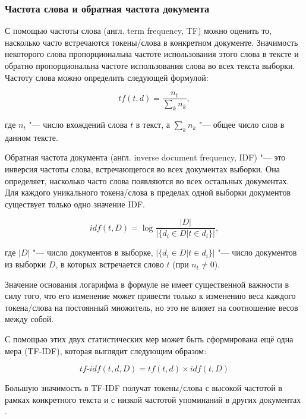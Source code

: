 \documentclass[bachelor, och, coursework]{SCWorks}
\begin{document}
        \subsubsection{Частота слова и обратная частота документа}

            С помощью частоты слова (англ. term frequency, TF) можно оценить то,
            насколько часто встречаются токены/слова в конкретном документе.
            Значимость некоторого слова пропорциональна частоте использования
            этого слова в тексте и обратно пропорциональна частоте использования
            слова во всех текста выборки. Частоту слова можно определить
            следующей формулой:

            $$tf(t, d) = \frac{n_t}{\sum_k n_k},$$

            где $n_t$ "--- число вхождений слова $t$ в текст, а $\sum_k n_k$
            "--- общее число слов в данном тексте.

            Обратная частота документа (англ. inverse document frequency, IDF)
            "--- это инверсия частоты слова, встречающегося во всех документах
            выборки. Она определяет, насколько часто слова появляются во всех
            остальных документах. Для каждого уникального токена/слова в
            пределах одной выборки документов существует только одно значение
            IDF.

            $$idf(t, D) = \log \frac{|D|}{|\{d_i \in D | t \in d_i \}|},$$

            где $|D|$ "--- число документов в выборке, $|\{d_i \in D | t \in d_i
            \}|$ "--- число документов из выборки $D$, в которых встречается
            слово $t$ (при $n_t \neq 0$).

            Значение основания логарифма в формуле не имеет существенной
            важности в силу того, что его изменение может привести только к
            изменению веса каждого токена/слова на постоянный множитель, но это
            не влияет на соотношение весов между собой.

            С помощью этих двух статистических мер может быть сформирована ещё
            одна мера (TF-IDF), которая выглядит следующим образом:

            $$tf \text{-} idf(t, d, D) = tf(t,d) \times idf(t, D)$$

            Большую значимость в TF-IDF получат токены/слова с высокой частотой
            в рамках конкретного текста и с низкой частотой упоминаний в других
            документах \cite{tf}.
\end{document}
